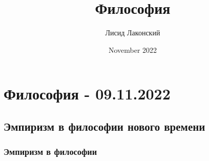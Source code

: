 \documentclass{article}
\title{Философия}
\author{Лисид Лаконский}
\date{November 2022}
\begin{document}
\maketitle
\tableofcontents
\pagebreak

\section{Философия - 09.11.2022}

\subsection{Эмпиризм в философии нового времени}

\subsubsection{Эмпиризм в философии}
\end{document}
